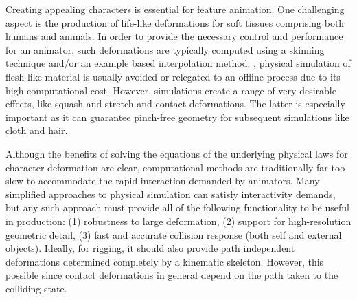 Creating appealing characters is essential for  feature animation. One challenging aspect is the production of life-like deformations for soft tissues comprising both humans and animals. In order to provide the necessary control and performance for an animator, such deformations are typically computed using a skinning technique and/or an example based interpolation method. , physical simulation of flesh-like material is usually avoided or relegated to an offline process due to its high computational cost. However, simulations create a range of very desirable effects, like squash-and-stretch and contact deformations. The latter is especially important as it can guarantee pinch-free geometry for subsequent simulations like cloth and hair. 


Although the benefits of solving the equations of the underlying physical laws for character deformation are clear, computational methods are traditionally far too slow to accommodate the rapid interaction demanded by animators. Many simplified approaches to physical simulation can satisfy interactivity demands, but any such approach must provide all of the following functionality to be useful in production: (1) robustness to large deformation, (2) support for high-resolution geometric detail, (3) fast and accurate collision response (both self and external objects). Ideally, for rigging, it should also provide  path independent deformations determined completely by a kinematic skeleton. However, this  possible since contact deformations in general depend on the path taken to the colliding state.


